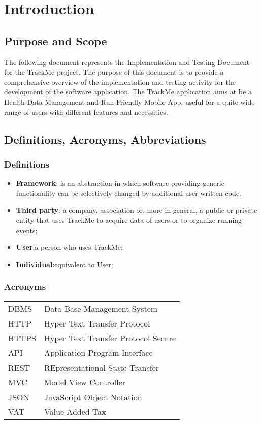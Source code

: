 \section{Introduction}
\subsection{Purpose and Scope}
	The following document represents the Implementation and Testing Document for
the TrackMe project.
The purpose of this document is to provide a comprehensive overview of the
implementation and testing activity for the development of the software application.
The TrackMe application aims at be a Health Data Management and Run-Friendly Mobile
App, useful for a quite wide range of users with different features and necessities.
\subsection{Definitions, Acronyms, Abbreviations}

\subsubsection{Definitions}
\begin{itemize}
	\item \textbf{Framework}: is an abstraction in which software providing generic functionality can be selectively changed by additional user-written code.
		
	\item \textbf{Third party}: a company, association or, more in general, a public or private entity that uses TrackMe to acquire data of users or to organize running events;
	
	\item \textbf{User}:a person who uses TrackMe;

	\item \textbf{Individual}:equivalent to User;

	
\end{itemize}

\subsubsection{Acronyms}

\begin{center}
	\begin{tabular}{| l | l |}
		\hline
		DBMS & Data Base Management System\\
		HTTP & Hyper Text Transfer Protocol\\
		HTTPS & Hyper Text Transfer Protocol Secure\\
		API & Application Program Interface \\
		REST & REpresentational State Transfer\\
		MVC & Model View Controller\\
		JSON & JavaScript Object Notation \\
		VAT & Value Added Tax\\
		\hline
	\end{tabular}
\end{center}

